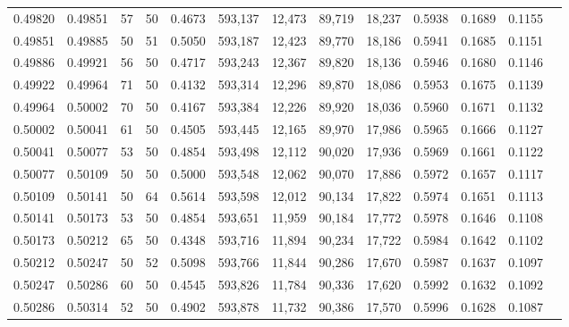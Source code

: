 \begin{tabular}{rrrrrrrrrrrrr}
0.49820 & 0.49851 &    57 &  50 &                                     0.4673 & 593,137 &  12,473 &  89,719 &  18,237 & 0.5938 & 0.1689 & 0.1155 \\
0.49851 & 0.49885 &    50 &  51 &                                     0.5050 & 593,187 &  12,423 &  89,770 &  18,186 & 0.5941 & 0.1685 & 0.1151 \\
0.49886 & 0.49921 &    56 &  50 &                                     0.4717 & 593,243 &  12,367 &  89,820 &  18,136 & 0.5946 & 0.1680 & 0.1146 \\
0.49922 & 0.49964 &    71 &  50 &                                     0.4132 & 593,314 &  12,296 &  89,870 &  18,086 & 0.5953 & 0.1675 & 0.1139 \\
0.49964 & 0.50002 &    70 &  50 &                                     0.4167 & 593,384 &  12,226 &  89,920 &  18,036 & 0.5960 & 0.1671 & 0.1132 \\
0.50002 & 0.50041 &    61 &  50 &                                     0.4505 & 593,445 &  12,165 &  89,970 &  17,986 & 0.5965 & 0.1666 & 0.1127 \\
0.50041 & 0.50077 &    53 &  50 &                                     0.4854 & 593,498 &  12,112 &  90,020 &  17,936 & 0.5969 & 0.1661 & 0.1122 \\
0.50077 & 0.50109 &    50 &  50 &                                     0.5000 & 593,548 &  12,062 &  90,070 &  17,886 & 0.5972 & 0.1657 & 0.1117 \\
0.50109 & 0.50141 &    50 &  64 &                                     0.5614 & 593,598 &  12,012 &  90,134 &  17,822 & 0.5974 & 0.1651 & 0.1113 \\
0.50141 & 0.50173 &    53 &  50 &                                     0.4854 & 593,651 &  11,959 &  90,184 &  17,772 & 0.5978 & 0.1646 & 0.1108 \\
0.50173 & 0.50212 &    65 &  50 &                                     0.4348 & 593,716 &  11,894 &  90,234 &  17,722 & 0.5984 & 0.1642 & 0.1102 \\
0.50212 & 0.50247 &    50 &  52 &                                     0.5098 & 593,766 &  11,844 &  90,286 &  17,670 & 0.5987 & 0.1637 & 0.1097 \\
0.50247 & 0.50286 &    60 &  50 &                                     0.4545 & 593,826 &  11,784 &  90,336 &  17,620 & 0.5992 & 0.1632 & 0.1092 \\
0.50286 & 0.50314 &    52 &  50 &                                     0.4902 & 593,878 &  11,732 &  90,386 &  17,570 & 0.5996 & 0.1628 & 0.1087 \\

\end{tabular}
